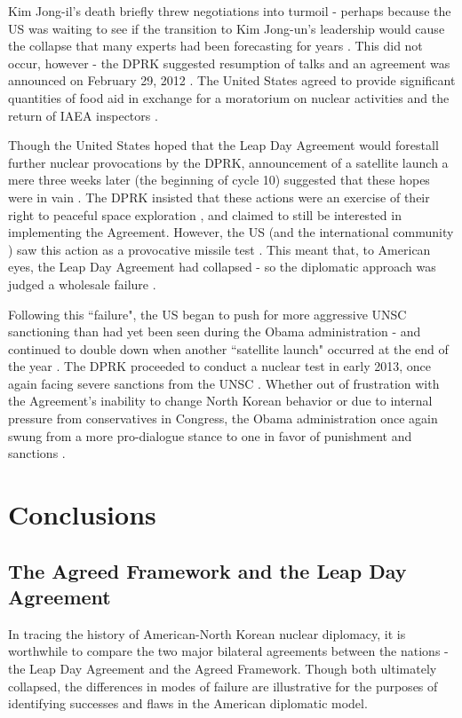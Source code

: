\documentclass{article}
\begin{document}
Kim Jong-il's death briefly threw negotiations into turmoil \cite{crs13} - perhaps because the US was waiting to see if the transition to Kim Jong-un's leadership would cause the collapse that many experts had been forecasting for years \cite{delury}. This did not occur, however - the DPRK suggested resumption of talks and an agreement was announced on February 29, 2012 \cite{delury}. The United States agreed to provide significant quantities of food aid in exchange for a moratorium on nuclear activities and the return of IAEA inspectors \cite{crs13}.

Though the United States hoped that the Leap Day Agreement would forestall further nuclear provocations by the DPRK, announcement of a satellite launch a mere three weeks later (the beginning of cycle 10) suggested that these hopes were in vain \cite{snyder2}. The DPRK insisted that these actions were an exercise of their right to peaceful space exploration \cite{crs13}, and claimed to still be interested in implementing the Agreement. However, the US (and the international community \cite{unsc13}) saw this action as a provocative missile test \cite{davenport}. This meant that, to American eyes, the Leap Day Agreement had collapsed - so the diplomatic approach was judged a wholesale failure \cite{delury}.

Following this ``failure", the US began to push for more aggressive UNSC sanctioning than had yet been seen during the Obama administration - and continued to double down when another ``satellite launch" occurred at the end of the year \cite{crs13}. The DPRK proceeded to conduct a nuclear test in early 2013, once again facing severe sanctions from the UNSC \cite{davenport}. Whether out of frustration with the Agreement's inability to change North Korean behavior or due to internal pressure from conservatives in Congress, the Obama administration once again swung from a more pro-dialogue stance to one in favor of punishment and sanctions \cite{snyder2}.


\section{Conclusions}

\subsection{The Agreed Framework and the Leap Day Agreement}

In tracing the history of American-North Korean nuclear diplomacy, it is worthwhile to compare the two major bilateral agreements between the nations - the Leap Day Agreement and the Agreed Framework. Though both ultimately collapsed, the differences in modes of failure are illustrative for the purposes of identifying successes and flaws in the American diplomatic model.
\end{document}
